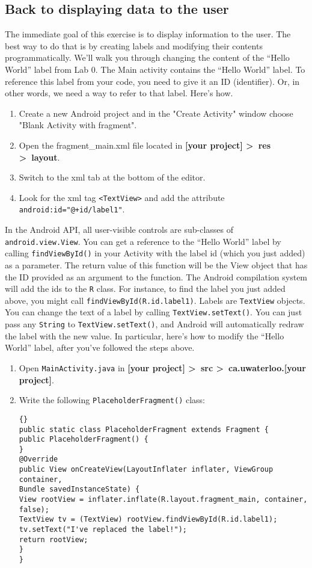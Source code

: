\documentclass[10pt]{article}
\begin{document}
\subsection{Back to displaying data to the user} The immediate goal of this exercise is to display information to the user. The best way to do that is by creating labels and modifying their contents programmatically. We'll walk you through changing the content of the ``Hello World'' label from Lab 0.
The Main activity contains the ``Hello World'' label. To reference this label from your code, you need to give it an ID (identifier). Or, in other words, we need a way to refer to that label. Here's how.
\begin{enumerate}
\item Create a new Android project and in the "Create Activity" window choose "Blank Activity with fragment".
\item Open the fragment\_main.xml file located in \textbf{[your project] \textgreater~res \textgreater~layout}.
\item Switch to the xml tab at the bottom of the editor.
\item Look for the xml tag \verb+<TextView>+ and add the attribute \verb-android:id="@+id/label1"-.
\end{enumerate}
In the Android API, all user-visible controls are sub-classes of {\tt android.view.View}. You can get a reference to the ``Hello World'' label by calling {\tt findViewById()} in your Activity with the label id (which you just added) as a parameter. The return value of this function will be the View object that has the ID provided as an argument to the function. The Android compilation system will add the ids to the {\tt R} class. For instance, to find the label you just added above, you might call {\tt findViewById(R.id.label1)}.
Labels are {\tt TextView} objects. You can change the text of a label by calling {\tt TextView.setText()}. You can just pass any {\tt String} to
{\tt TextView.setText()}, and Android will automatically redraw the label with the
new value.
In particular, here's how to modify the ``Hello World'' label, after you've followed
the steps above.
\begin{enumerate}
\item Open {\tt MainActivity.java} in \textbf{[your project] \textgreater~src \textgreater~ca.uwaterloo.[your project]}.
\item Write the following {\tt PlaceholderFragment()} class:
\begin{lstlisting}[]{}
public static class PlaceholderFragment extends Fragment {
public PlaceholderFragment() {
}
@Override
public View onCreateView(LayoutInflater inflater, ViewGroup container,
Bundle savedInstanceState) {
View rootView = inflater.inflate(R.layout.fragment_main, container,
false);
TextView tv = (TextView) rootView.findViewById(R.id.label1);
tv.setText("I've replaced the label!");
return rootView;
}
}
\end{lstlisting}
\end{enumerate}
\end{document}
